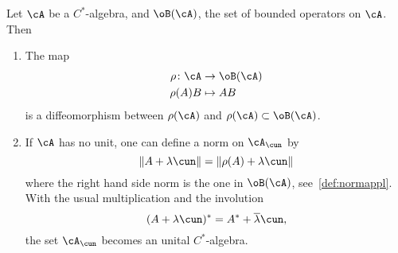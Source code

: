 \begin{lemma}
Let $\cA$ be a $C^*$-algebra, and $\oB(\cA)$, the set of bounded operators on $\cA$. Then

\begin{enumerate}
\item The map
        \begin{equation}
        \begin{aligned}
            \rho \colon \cA &\to \oB(\cA)\\
            \rho(A)B&\mapsto AB
        \end{aligned}
    \end{equation}
is a diffeomorphism between $\rho(\cA)$ and $\rho(\cA)\subset\oB(\cA)$.

\item If $\cA$ has no unit, one can define a norm on $\cA_{\cun}$ by
\begin{equation} \label{eq:normCAu}
\|A+\lambda\cun\|=\|\rho(A)+\lambda\cun\|
\end{equation}
where the right hand side norm is the one in $\oB(\cA)$, see~\ref{def:normappl}. With the usual multiplication and the involution
\begin{equation}
  (A+\lambda\cun)^*=A^*+ \overline{\lambda} \cun,
\end{equation}
the set $\cA_{\cun}$ becomes an unital $C^*$-algebra.

\end{enumerate}
 \label{lem:unitariz_C}
\end{lemma}


